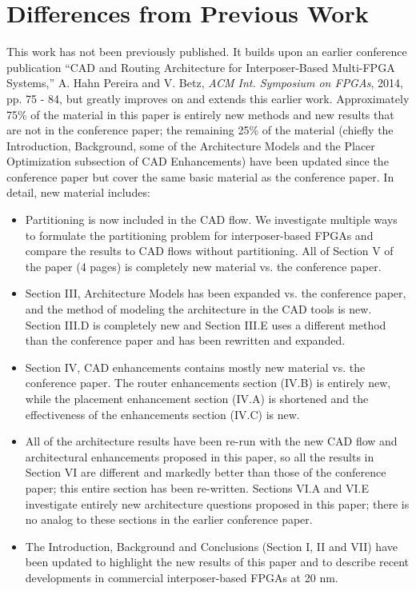 \section*{Differences from Previous Work}
This work has not been previously published. It builds upon an earlier conference publication ``CAD and Routing Architecture for Interposer-Based Multi-FPGA Systems,'' A. Hahn Pereira and V. Betz, \textit{ACM Int. Symposium on FPGAs}, 2014, pp. 75 - 84, but greatly improves on and extends this earlier work.  Approximately 75\% of the material in this paper is entirely new methods and new results that are not in the conference paper; the remaining 25\% of the material (chiefly the Introduction, Background, some of the Architecture Models and the Placer Optimization subsection of CAD Enhancements) have been updated since the conference paper but cover the same basic material as the conference paper. In detail, new material includes:

\begin{itemize}
\item Partitioning is now included in the CAD flow. We investigate multiple ways to formulate the partitioning problem for interposer-based FPGAs and compare the results to CAD flows without partitioning. All of Section V of the paper (4 pages) is completely new material vs. the conference paper.

\item Section III, Architecture Models has been expanded vs. the conference paper, and the method of modeling the architecture in the CAD tools is new.  Section III.D is completely new and Section III.E uses a different method than the conference paper and has been rewritten and expanded.

\item Section IV, CAD enhancements contains mostly new material vs. the conference paper. The router enhancements section (IV.B) is entirely new, while the placement enhancement section (IV.A) is shortened and the effectiveness of the enhancements section (IV.C) is new.

\item All of the architecture results have been re-run with the new CAD flow and architectural enhancements proposed in this paper, so all the results in Section VI are different and markedly better than those of the conference paper; this entire section has been re-written. Sections VI.A and VI.E investigate entirely new architecture questions proposed in this paper; there is no analog to these sections in the earlier conference paper.

\item The Introduction, Background and Conclusions (Section I, II and VII) have been updated to highlight the new results of this paper and to describe recent developments in commercial interposer-based FPGAs at 20 nm.
\end {itemize}


